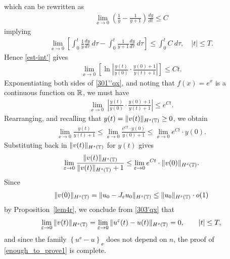 which can be rewritten as
\begin{equation*}
\begin{split}
\lim_{\ee \to 0}
\left( \frac{1}{y} - \frac{1}{y+1} \right)\frac{dy}{dt} \le C
\end{split}
\end{equation*}
implying
\begin{equation}
\label{est-int'}
\begin{split}
\lim_{\ee \to 0} \left [
\int_0^t \frac{1}{y} \frac{dy}{d \tau} \ d \tau
- \int_0^t \frac{1}{y+1} \frac{dy}{d \tau} \ d \tau \right ]
\le \int_0^t C \ d \tau, \quad |t| \le T.
\end{split}
\end{equation}
Hence \eqref{est-int'} gives 
\begin{equation}
\begin{split}
\lim_{\ee \to 0} 
\left [ \ln \left | \frac{y(t)}{y(0)}
\cdot \frac{y(0) + 1}{y(t) + 1} \right | \right ] \le C t.
\label{301''qx}
\end{split}
\end{equation}
Exponentiating both sides of \eqref{301''qx}, and noting that $f(x) = e^x$
is a continuous function on $\mathbb{R}$, we must have
\begin{equation*}
\begin{split}
\lim_{\ee \to 0}  \
\left | \frac{y(t)}{y(0)} \cdot \frac{y(0) + 1}{y(t) + 1} \right | \le e^{C t}.
\end{split}
\end{equation*}
Rearranging, and recalling that $y(t) = \|v(t)\|_{H^s(\mathbb{T})} \ge 0$, we obtain
\begin{equation*}
\begin{split}
\lim_{\ee \to 0} \frac{y(t)}{y(t) + 1}
\le \lim_{\ee \to 0} \frac{e^{C t} \cdot y(0)}{y(0) + 1} \le
\lim_{\ee \to 0} e^{C t} \cdot y(0).
\end{split}
\end{equation*}
Substituting back in $\|v(t)\|_{H^s(\mathbb{T})}$ for $y(t)$ gives
\begin{equation}
\begin{split}
\lim_{\varepsilon \to 0}	\frac{\|v(t)\|_{H^s(\mathbb{T})}}{\|v(t)\|_{H^s(\mathbb{T})} + 1}  \le
\lim_{\varepsilon \to 0} e^{C t} \cdot \|v(0)\|_{H^s(\mathbb{T})}.
\label{303'qx}
\end{split}
\end{equation}
Since 
\begin{equation*}
\label{303''qx}
\begin{split}
\|v(0)\|_{H^s(\mathbb{T})} = \|u_0 - J_\varepsilon u_0 \|_{H^s(\mathbb{T})} \le
\|u_0\|_{H^s(\mathbb{T})} \cdot o(1)
\end{split}
\end{equation*}
by Proposition~\ref{lem4r}, we conclude from \eqref{303'qx} that
\begin{equation}
\label{304qx}
\begin{split}
\lim_{\varepsilon \to 0} \|v(t)\|_{H^s(\mathbb{T})} = \lim_{\varepsilon \to 0}
\|u^\varepsilon(t) - u(t)\|_{H^s(\mathbb{T})}= 0, \qquad |t| \le T,
\end{split}
\end{equation}
and since the family $\left\{ u^\ee - u \right\}_\ee$ does not depend on $n$,
the proof of \eqref{enough_to_prove1} is complete. 
%
%
%
%
%
%
%
%
